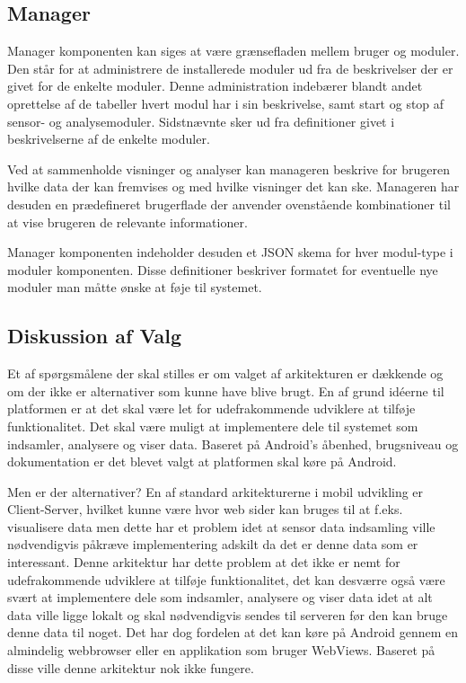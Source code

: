 \subsection*{Manager}\label{subsec:arkitektur-Manager}
Manager komponenten kan siges at være grænsefladen mellem bruger og moduler.
Den står for at administrere de installerede moduler ud fra de beskrivelser der er givet for de enkelte moduler.
Denne administration indebærer blandt andet oprettelse af de tabeller hvert modul har i sin beskrivelse, samt start og stop af sensor- og analysemoduler.
Sidstnævnte sker ud fra definitioner givet i beskrivelserne af de enkelte moduler.

Ved at sammenholde visninger og analyser kan manageren beskrive for brugeren hvilke data der kan fremvises og med hvilke visninger det kan ske.
Manageren har desuden en prædefineret brugerflade der anvender ovenstående kombinationer til at vise brugeren de relevante informationer.

Manager komponenten indeholder desuden et JSON skema for hver modul-type i moduler komponenten.
Disse definitioner beskriver formatet for eventuelle nye moduler man måtte ønske at føje til systemet.

\subsection{Diskussion af Valg}
Et af spørgsmålene der skal stilles er om valget af arkitekturen er dækkende og om der ikke er alternativer som kunne have blive brugt.
En af grund idéerne til platformen er at det skal være let for udefrakommende udviklere at tilføje funktionalitet. 
Det skal være muligt at implementere dele til systemet som indsamler, analysere og viser data.
Baseret på Android's åbenhed, brugsniveau og dokumentation er det blevet valgt at platformen skal køre på Android.

Men er der alternativer? En af standard arkitekturerne i mobil udvikling er Client-Server, hvilket kunne være hvor web sider kan bruges til at f.eks. visualisere data men dette har et problem idet at sensor data indsamling ville nødvendigvis påkræve implementering adskilt da det er denne data som er interessant.
Denne arkitektur har dette problem at det ikke er nemt for udefrakommende udviklere at tilføje funktionalitet, det kan desværre også være svært at implementere dele som indsamler, analysere og viser data idet at alt data ville ligge lokalt og skal nødvendigvis sendes til serveren før den kan bruge denne data til noget. 
Det har dog fordelen at det kan køre på Android gennem en almindelig webbrowser eller en applikation som bruger WebViews.
Baseret på disse ville denne arkitektur nok ikke fungere.


